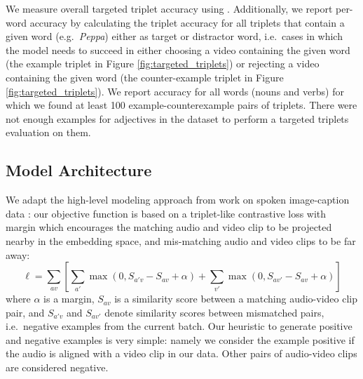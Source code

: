 We measure overall targeted triplet accuracy using
. Additionally, we report per-word accuracy by
calculating the triplet accuracy for all triplets that contain a given
word (e.g.\ \textit{Peppa}) either as target or distractor word, i.e.\ cases
in which the model needs to succeed in either choosing a video
containing the given word (the example triplet in Figure
\ref{fig:targeted_triplets}) or rejecting a video containing the given
word (the counter-example triplet in Figure
\ref{fig:targeted_triplets}).
We report accuracy for all words (nouns and verbs) for which we found at least 100 example-counterexample pairs of triplets. There were not enough examples for adjectives in the dataset to perform a targeted triplets evaluation on them. 



\subsection{Model Architecture}
\label{sec:model}
We adapt the high-level modeling approach from work on spoken
image-caption data
\citep{harwath2016unsupervised,chrupala-etal-2017-representations}:
our objective function is based on a triplet-like contrastive loss with margin which
encourages the matching audio and video clip to be projected nearby in
the embedding space, and mis-matching audio and video clips to be far
away:
\begin{dmath}
  \ell = \sum_{av}\left[\sum_{a'} \max(0, S_{a'v} - S_{av} +
    \alpha) + \sum_{v'} \max(0, S_{av'} - S_{av} + \alpha) \right]
  \label{eq:triplet}
\end{dmath}
where $\alpha$ is a margin, $S_{av}$ is a similarity score between a
matching audio-video clip pair, and $S_{a'v}$ and $S_{av'}$ denote
similarity scores between mismatched pairs, i.e.\ negative examples
from the current batch. Our heuristic to generate positive and
negative examples is very simple: namely we consider the example
positive if the audio is aligned with a video clip in our
data. Other pairs of audio-video clips are considered negative.

